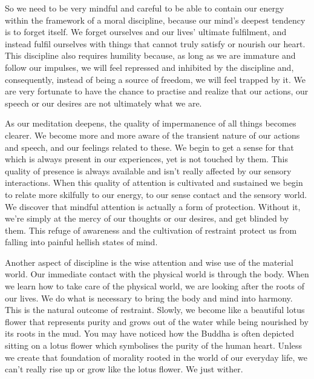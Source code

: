 So we need to be very mindful and careful to be able to contain our energy within the framework of a moral discipline, because our mind's deepest  tendency is to forget itself. We forget ourselves and our lives' ultimate fulfilment, and instead fulfil ourselves with things that cannot truly satisfy or nourish our heart. This discipline also requires humility because, as long as we are immature and follow our impulses, we will feel repressed and inhibited by the discipline and, consequently, instead of being a source of freedom, we will feel trapped by it. We are very fortunate to have the chance to practise and realize that our actions, our speech or our desires are not ultimately what we are.

As our meditation deepens, the quality of impermanence of all things becomes clearer. We become more and more aware of the transient nature of our actions and speech, and our feelings related to these. We begin to get a sense for that which is always present in our experiences, yet is not touched by them. This quality of presence is always available and isn't really affected by our sensory interactions. When this quality of attention is cultivated and sustained we begin to relate more skilfully to our energy, to our sense contact and the sensory world. We discover that mindful attention is actually a form of protection. Without it, we're simply at the mercy of our thoughts or our desires, and get blinded by them. This refuge of awareness and the cultivation of restraint protect us from falling into painful hellish states of mind.

Another aspect of discipline is the wise attention and wise use of the material world. Our immediate contact with the physical world is through the body. When we learn how to take care of the physical world, we are looking after the roots of our lives. We do what is necessary to bring the body and mind into harmony. This is the natural outcome of restraint. Slowly, we become like a beautiful lotus flower that represents purity and grows out of the water while being nourished by its roots in the mud. You may have noticed how the Buddha is often depicted sitting on a lotus flower which symbolises the purity of the human heart. Unless we create that foundation of morality rooted in the world of our everyday life, we can't really rise up or grow like the lotus flower. We just wither.

